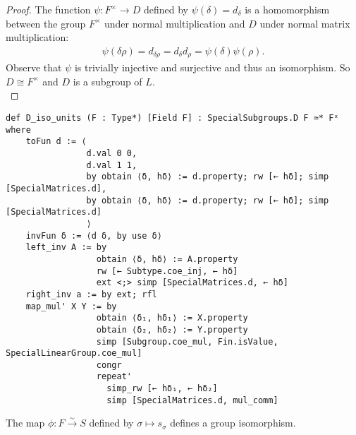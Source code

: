 \begin{proof}
    \leanok
    The function $\psi: F^\times \rightarrow D$ defined by $\psi(\delta) = d_\delta$ is a homomorphism between the group $F^\times$ under normal multiplication and $D$ under normal matrix multiplication:
\begin{align*} 
  \psi(\delta \rho) = d_{\delta \rho} =  d_\delta d_\rho = \psi(\delta) \psi(\rho). 
\end{align*}
Observe that $\psi$ is trivially injective and surjective and thus an isomorphism. So $D\cong F^\times$ and $D$ is a subgroup of $L$.\\
\end{proof}
\begin{footnotesize}
\begin{verbatim}
def D_iso_units (F : Type*) [Field F] : SpecialSubgroups.D F ≃* Fˣ where
    toFun d := ⟨
                d.val 0 0,
                d.val 1 1,
                by obtain ⟨δ, hδ⟩ := d.property; rw [← hδ]; simp [SpecialMatrices.d],
                by obtain ⟨δ, hδ⟩ := d.property; rw [← hδ]; simp [SpecialMatrices.d]
                ⟩
    invFun δ := ⟨d δ, by use δ⟩
    left_inv A := by
                  obtain ⟨δ, hδ⟩ := A.property
                  rw [← Subtype.coe_inj, ← hδ]
                  ext <;> simp [SpecialMatrices.d, ← hδ]
    right_inv a := by ext; rfl
    map_mul' X Y := by
                  obtain ⟨δ₁, hδ₁⟩ := X.property
                  obtain ⟨δ₂, hδ₂⟩ := Y.property
                  simp [Subgroup.coe_mul, Fin.isValue, SpecialLinearGroup.coe_mul]
                  congr
                  repeat'
                    simp_rw [← hδ₁, ← hδ₂]
                    simp [SpecialMatrices.d, mul_comm]
\end{verbatim}
\end{footnotesize}



\begin{definition}
\label{SpecialSubgroups.S_iso_F}
\leanok
    The map $\phi : F \overset{\sim}{\rightarrow} S$ defined by $\sigma \mapsto s_\sigma$ defines a group isomorphism.
\end{definition}

